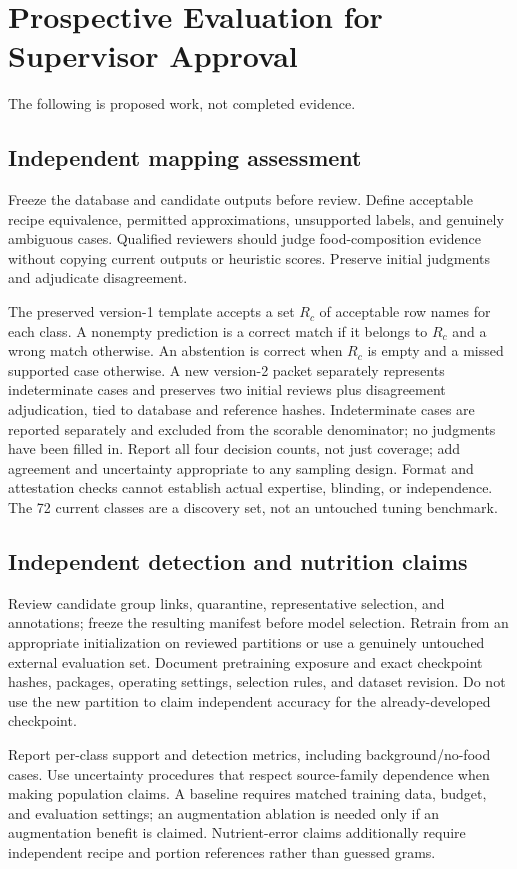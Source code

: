 \documentclass[12pt,journal,draftclsnofoot,onecolumn]{IEEEtran}
\begin{document}
\section{Prospective Evaluation for Supervisor Approval}
The following is proposed work, not completed evidence.

\subsection{Independent mapping assessment}
Freeze the database and candidate outputs before review. Define acceptable recipe equivalence, permitted approximations, unsupported labels, and genuinely ambiguous cases. Qualified reviewers should judge food-composition evidence without copying current outputs or heuristic scores. Preserve initial judgments and adjudicate disagreement.

The preserved version-1 template accepts a set $R_c$ of acceptable row names for each class. A nonempty prediction is a correct match if it belongs to $R_c$ and a wrong match otherwise. An abstention is correct when $R_c$ is empty and a missed supported case otherwise. A new version-2 packet separately represents indeterminate cases and preserves two initial reviews plus disagreement adjudication, tied to database and reference hashes. Indeterminate cases are reported separately and excluded from the scorable denominator; no judgments have been filled in. Report all four decision counts, not just coverage; add agreement and uncertainty appropriate to any sampling design. Format and attestation checks cannot establish actual expertise, blinding, or independence. The 72 current classes are a discovery set, not an untouched tuning benchmark.

\subsection{Independent detection and nutrition claims}
Review candidate group links, quarantine, representative selection, and annotations; freeze the resulting manifest before model selection. Retrain from an appropriate initialization on reviewed partitions or use a genuinely untouched external evaluation set. Document pretraining exposure and exact checkpoint hashes, packages, operating settings, selection rules, and dataset revision. Do not use the new partition to claim independent accuracy for the already-developed checkpoint.

Report per-class support and detection metrics, including background/no-food cases. Use uncertainty procedures that respect source-family dependence when making population claims. A baseline requires matched training data, budget, and evaluation settings; an augmentation ablation is needed only if an augmentation benefit is claimed. Nutrient-error claims additionally require independent recipe and portion references rather than guessed grams.
\end{document}
